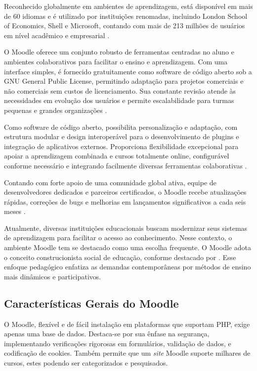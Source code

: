 Reconhecido globalmente em ambientes de aprendizagem, está disponível em mais de 60 idiomas e é utilizado por instituições renomadas, incluindo London School of Economics, Shell e Microsoft, contando com mais de 213 milhões de usuários em nível acadêmico e empresarial \cite{moodle}. 

O Moodle oferece um conjunto robusto de ferramentas centradas no aluno e ambientes colaborativos para facilitar o ensino e aprendizagem. Com uma interface simples, é fornecido gratuitamente como software de código aberto sob a GNU General Public License, permitindo adaptação para projetos comerciais e não comerciais sem custos de licenciamento. Sua constante revisão atende às necessidades em evolução dos usuários e permite escalabilidade para turmas pequenas e grandes organizações \cite{moodle}. 

Como software de código aberto, possibilita personalização e adaptação, com estrutura modular e design interoperável para o desenvolvimento de plugins e integração de aplicativos externos. Proporciona flexibilidade excepcional para apoiar a aprendizagem combinada e cursos totalmente online, configurável conforme necessário e integrando facilmente diversas ferramentas colaborativas \cite{moodle}. 

Contando com forte apoio de uma comunidade global ativa, equipe de desenvolvedores dedicados e parceiros certificados, o Moodle recebe atualizações rápidas, correções de bugs e melhorias em lançamentos significativos a cada seis meses \cite{moodle}.

Atualmente, diversas instituições educacionais buscam modernizar seus sistemas de aprendizagem para facilitar o acesso ao conhecimento. Nesse contexto, o ambiente Moodle tem se destacado como uma escolha frequente. O Moodle adota o conceito construcionista social de educação, conforme destacado por \cite[p.~22]{galasso}. Esse enfoque pedagógico enfatiza as demandas contemporâneas por métodos de ensino mais dinâmicos e participativos.

\subsection{Características Gerais do Moodle}

O Moodle, flexível e de fácil instalação em plataformas que suportam PHP, exige apenas uma base de dados. Destaca-se por sua ênfase na segurança, implementando verificações rigorosas em formulários, validação de dados, e codificação de cookies. Também permite que um \textit{site} Moodle suporte milhares de cursos, estes podendo ser categorizados e pesquisados.

